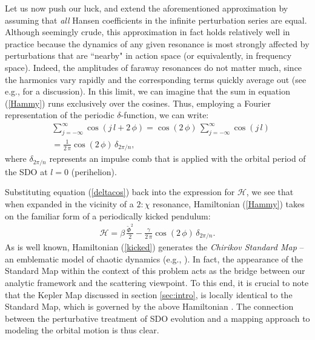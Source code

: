 \documentclass[twocolumn]{aastex62}
\newcommand{\Ham}{\mathcal{H}}
\begin{document}
Let us now push our luck, and extend the aforementioned approximation by assuming that \textit{all} Hansen coefficients in the infinite perturbation series are equal. Although seemingly crude, this approximation in fact holds relatively well in practice because the dynamics of any given resonance is most strongly affected by perturbations that are ``nearby" in action space (or equivalently, in frequency space). Indeed, the amplitudes of faraway resonances do not matter much, since the harmonics vary rapidly and the corresponding terms quickly average out (see e.g., \citealt{Wisdom1982} for a discussion). In this limit, we can imagine that the sum in equation (\ref{Hammy}) runs exclusively over the cosines. Thus, employing a Fourier representation of the periodic $\delta$-function, we can write:
\begin{align}
&\sum_{j=-\infty}^{\infty}\cos(j\,l+2\,\phi)=\cos(2\,\phi)\,\sum_{j=-\infty}^{\infty}\cos(j\,l) \nonumber\\
&= \frac{1}{2\,\pi} \cos(2\,\phi) \, \delta_{2\pi/n},
\label{deltacos}
\end{align}
where $\delta_{2\pi/n}$ represents an impulse comb that is applied with the orbital period of the SDO at $l=0$ (perihelion).

Substituting equation (\ref{deltacos}) back into the expression for $\Ham$, we see that when expanded in the vicinity of a $2:\chi$ resonance, Hamiltonian (\ref{Hammy}) takes on the familiar form of a periodically kicked pendulum: 
\begin{align}
\Ham=\beta\,\frac{\tilde{\Phi}^2}{2}- \frac{\gamma}{2\,\pi} \cos(2\,\phi)\, \delta_{2\pi/n}.
\label{kicked}
\end{align}
As is well known, Hamiltonian (\ref{kicked}) generates the \textit{Chirikov Standard Map} -- an emblematic model of chaotic dynamics (e.g., \citealt{LLbook,Chirikov1979}). In fact, the appearance of the Standard Map within the context of this problem acts as the bridge between our analytic framework and the scattering viewpoint. To this end, it is crucial to note that the Kepler Map discussed in section \ref{sec:intro}, is locally identical to the Standard Map, which is governed by the above Hamiltonian \citep{2011NewA...16...94S, 2009IJMPD..18.1903K}. The connection between the perturbative treatment of SDO evolution and a mapping approach to modeling the orbital motion is thus clear.
\end{document}
